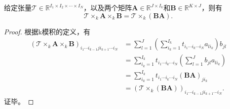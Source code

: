 \begin{property}\label{prop:associative}
    给定张量\( \mathcal{T} \in \mathbb{R}^{I_1 \times I_2 \times \cdots \times I_N} \)，以及两个矩阵\( \mathbf{A} \in \mathbb{R}^{J \times I_k} \)和\( \mathbf{B} \in \mathbb{R}^{K \times J} \)，则有
    \[
        \mathcal{T} \times_k \mathbf{A} \times_k \mathbf{B} = \mathcal{T} \times_k (\mathbf{B} \mathbf{A}).
    \]
\end{property}
\begin{proof}
    根据k模积的定义，有
    \begin{align*}
        \left(\mathcal{T}\times_k \mathbf{A}\times_k \mathbf{B}\right)_{i_1\cdots i_{k-1}j i_{k+1}\cdots i_N}
         & =\sum_{l=1}^{J}\left(\sum_{i_k=1}^{I_k}
        t_{i_1\cdots i_k\cdots i_N} a_{l i_k}\right)b_{jl}                                                    \\
         & =\sum_{i_k=1}^{I_k}t_{i_1\cdots i_k\cdots i_N}
        \left(\sum_{l=1}^{J}b_{jl}a_{l i_k}\right)                                                            \\
         & =\sum_{i_k=1}^{I_k}t_{i_1\cdots i_k\cdots i_N}(\mathbf{B} \mathbf{A})_{j i_k}                      \\
         & = \left(\mathcal{T}\times_k (\mathbf{B}\mathbf{A})\right)_{i_1\cdots i_{k-1} j i_{k+1}\cdots i_N}.
    \end{align*}
    证毕。
\end{proof}

